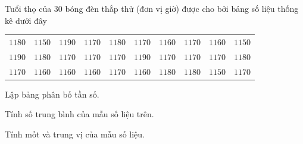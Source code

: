 \begin{bt}%
Tuổi thọ của $30$ bóng đèn thắp thử (đơn vị giờ) được cho bởi bảng số liệu thống kê dưới đây
\begin{center}\begin{tabular}{|cccccccccc|}
\hline
$1180$ & $1150$ & $1190$ & $1170$ & $1180$ & $1170$ & $1160$ & $1170$ & $1160$ & $1150$ \\
$1190$ & $1180$ & $1170$ & $1170$ & $1170$ & $1190$ & $1170$ & $1170$ & $1170$ & $1180$
 \\
$1170$ & $1160$ & $1160$ & $1160$ & $1170$ & $1160$ & $1180$ & $1180$ & $1150$ & $1170$ 
 \\
\hline
\end{tabular}
\end{center}
\begin{listEX}
\item Lập bảng phân bố tần số.
\item Tính số trung bình của mẫu số liệu trên.
\item Tính mốt và trung vị của mẫu số liệu.
\end{listEX}
\end{bt}

